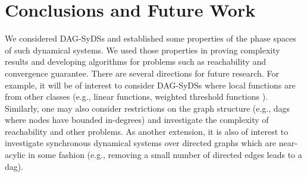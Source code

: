 \section{Conclusions and Future Work}
\label{sec:concl}
 
We considered DAG-SyDSs 
and established some properties of the phase spaces of
such dynamical systems. We used those properties in proving
complexity results and developing algorithms 
for problems such as reachability and convergence guarantee.
There are several directions for future research.
For example, it will be of interest to consider 
DAG-SyDSs where local functions are from other classes
(e.g., linear functions, weighted threshold functions \cite{Crama-Hammer-2011}).
Similarly, one may also consider restrictions
on the graph structure (e.g., dags where nodes have
bounded in-degrees) and investigate 
the complexity of reachability and other problems.
As another extension, it is also of interest to investigate
synchronous dynamical systems over directed graphs which are
near-acylic in some fashion (e.g., removing a small
number of directed edges leads to a dag).


\iffalse
\noindent
\paragraph{Conclusions.}


\paragraph{Open Questions.}

\begin{itemize}
\item For DAG linear SyDSs, how long can a phase space cycle and transient be,
as a function of depth.

\item For bounded degree DAG  SyDSs, how long can a phase space cycle and transient be,
as a function of depth.

\item For various classes of Boolean functions of interest, 
how long can a phase space cycle and transient be?
(If they are polynomially bounded as a function of the number of nodes,
then reachability is polynomially solvable.)
\end{itemize}
\fi
